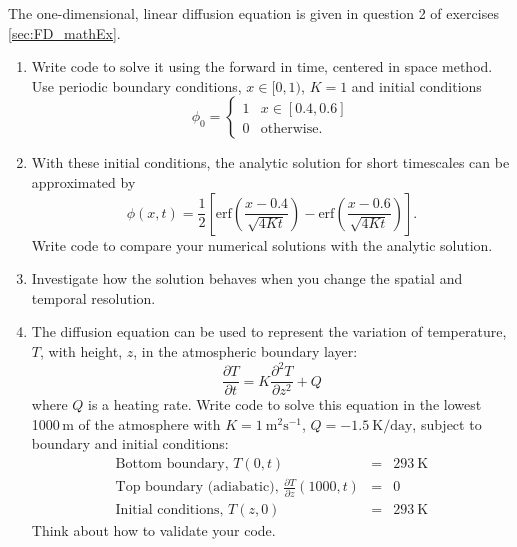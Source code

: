 The one-dimensional, linear diffusion equation is given in question
2 of exercises \ref{sec:FD_mathEx}. 
\begin{enumerate}
\item Write code to solve it using the forward in time, centered in space
method. Use periodic boundary conditions, $x\in[0,1)$, $K=1$ and
initial conditions
\[
\phi_{0}=\begin{cases}
1 & x\in\left[0.4,0.6\right]\\
0 & \text{otherwise}.
\end{cases}
\]
\item With these initial conditions, the analytic solution for short timescales
can be approximated by
\[
\phi\left(x,t\right)=\frac{1}{2}\left[\text{erf}\left(\frac{x-0.4}{\sqrt{4Kt}}\right)-\text{erf}\left(\frac{x-0.6}{\sqrt{4Kt}}\right)\right].
\]
Write code to compare your numerical solutions with the analytic solution.
\item Investigate how the solution behaves when you change the spatial and
temporal resolution.
\item The diffusion equation can be used to represent the variation of temperature,
$T$, with height, $z$, in the atmospheric boundary layer:
\[
\frac{\partial T}{\partial t}=K\frac{\partial^{2}T}{\partial z^{2}}+Q
\]
where $Q$ is a heating rate. Write code to solve this equation in
the lowest 1000\,m of the atmosphere with $K=1\ \text{m}^{2}\text{s}^{-1}$,
$Q=-1.5\ \text{K}/\text{day}$, subject to boundary and initial conditions:
\begin{eqnarray*}
\text{Bottom boundary, }T\left(0,t\right) & = & 293\ \text{K}\\
\text{Top boundary (adiabatic), }\frac{\partial T}{\partial z}\left(1000,t\right) & = & 0\\
\text{Initial conditions, }T\left(z,0\right) & = & 293\ \text{K}
\end{eqnarray*}
Think about how to validate your code.\clearpage{}
\end{enumerate}

